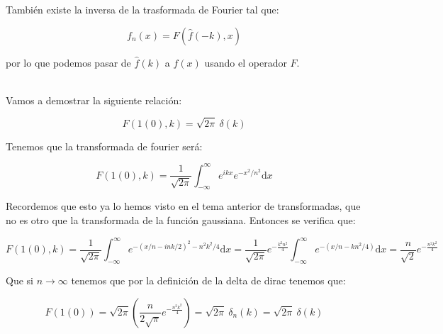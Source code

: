 \documentclass[12pt]{book}
\newcommand{\parentesis}[1]{\left( #1  \right)}
\newcommand{\D}{\mathrm{d}}
\newcommand{\inti}{\int_{-\infty}^{\infty}}
\newcommand{\hatf}{\widehat{f}}
\begin{document}
También existe la inversa de la trasformada de Fourier tal que:

\begin{equation}
f_n (x) = F(\hatf (-k), x)
\end{equation}

por lo que podemos pasar de $\hatf(k)$ a $f(x)$ usando el operador $F$. \\


\hrulefill \\

Vamos a demostrar la siguiente relación:

\begin{equation}
F(1(0),k) = \sqrt{2 \pi} \ \delta (k)
\end{equation}

Tenemos que la transformada de fourier será:

$$ F(1(0),k) = \dfrac{1}{\sqrt{2 \pi}} \inti e^{ikx} e^{-x^2/n^2} \D x $$

Recordemos que esto ya lo hemos visto en el tema anterior de transformadas, que no es otro que la transformada de la función gaussiana. Entonces se verifica que:

$$ F(1(0),k) = \dfrac{1}{\sqrt{2 \pi}} \inti e^{-(x/n-ink/2)^2-n^2k^2/4} \D x = \dfrac{1}{\sqrt{2 \pi}} e^{-\frac{k^2 n^2}{4}} \inti e^{-(x/n-k n^2 / 4)} \D x = \dfrac{n}{\sqrt{2}} e^{-\frac{n^2 k^2}{4}}  $$

Que si $n \rightarrow \infty$ tenemos que por la definición de la delta de dirac tenemos que:

$$ F(1(0)) = \sqrt{2 \pi} \parentesis{\dfrac{n}{ 2 \sqrt{\pi }} e^{-\frac{n^2 k^2}{4}} }  = \sqrt{2 \pi} \ \delta_n (k) = \sqrt{2 \pi} \ \delta(k) $$


\hrulefill 
\end{document}

